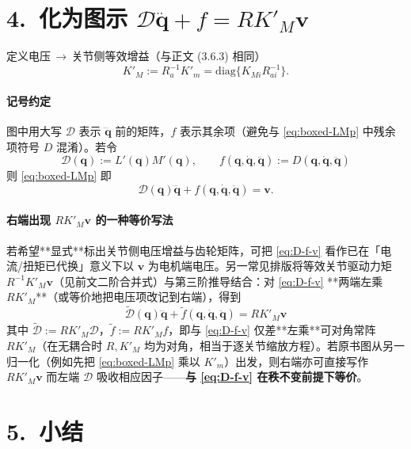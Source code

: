 \documentclass[UTF8,a4paper,12pt]{ctexart}
\begin{document}
\section*{4.\ 化为图示 $\mathcal{D}\dddot{\bm{q}}+f=R K'_M \bm{v}$}

定义电压\,$\to$\,关节侧等效增益（与正文 (3.6.3) 相同）
\begin{equation}
K'_M:=R_a^{-1}K'_m=\mathrm{diag}\{K_{Mi}R_{ai}^{-1}\}.
\end{equation}

\paragraph{记号约定} 图中用大写 $\mathcal{D}$ 表示 $\dddot{\bm{q}}$ 前的矩阵，$f$ 表示其余项（避免与 \eqref{eq:boxed-LMp} 中残余项符号 $D$ 混淆）。若令
\begin{equation}
\boxed{ \; \mathcal{D}(\bm{q}) := L'(\bm{q})M'(\bm{q}),\qquad
f(\bm{q},\dot{\bm{q}},\ddot{\bm{q}}):=D(\bm{q},\dot{\bm{q}},\ddot{\bm{q}})\;}
\label{eq:script-D-f}
\end{equation}
则 \eqref{eq:boxed-LMp} 即
\begin{equation}
\mathcal{D}(\bm{q})\dddot{\bm{q}}+f(\bm{q},\dot{\bm{q}},\ddot{\bm{q}})=\bm{v}.
\label{eq:D-f-v}
\end{equation}

\paragraph{右端出现 $R K'_M \bm{v}$ 的一种等价写法}
若希望**显式**标出关节侧电压增益与齿轮矩阵，可把 \eqref{eq:D-f-v} 看作已在「电流/扭矩已代换」意义下以 $\bm{v}$ 为电机端电压。另一常见排版将等效关节驱动力矩 $R^{-1}K'_M\bm{v}$（见前文二阶合并式）与第三阶推导结合：对 \eqref{eq:D-f-v} **两端左乘 $R K'_M$**（或等价地把电压项改记到右端），得到
\begin{equation}
\boxed{ \; \widetilde{\mathcal{D}}(\bm{q})\dddot{\bm{q}}+\widetilde{f}(\bm{q},\dot{\bm{q}},\ddot{\bm{q}})
=R K'_M \bm{v}\;}
\label{eq:RKv}
\end{equation}
其中 $\widetilde{\mathcal{D}}:=R K'_M \mathcal{D}$，$\widetilde{f}:=R K'_M f$，即与 \eqref{eq:D-f-v} 仅差**左乘**可对角常阵 $R K'_M$（在无耦合时 $R,K'_M$ 均为对角，相当于逐关节缩放方程）。若原书图从另一归一化（例如先把 \eqref{eq:boxed-LMp} 乘以 $K'_m$）出发，则右端亦可直接写作 $R K'_M\bm{v}$ 而左端 $\mathcal{D}$ 吸收相应因子——\textbf{与 \eqref{eq:D-f-v} 在秩不变前提下等价}。

\section*{5.\ 小结}
\end{document}
